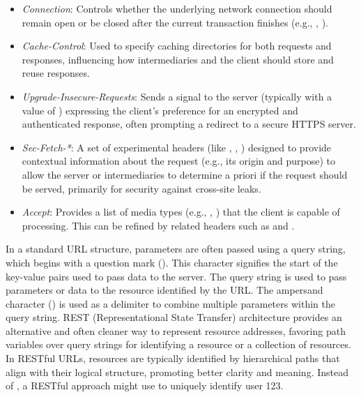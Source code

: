 \begin{itemize}
    \item \textit{Connection}: Controls whether the underlying network connection should remain open or be closed after the current transaction finishes (e.g., , ).
    \item \textit{Cache-Control}: Used to specify caching directories for both requests and responses, influencing how intermediaries and the client should store and reuse responses.
    \item \textit{Upgrade-Insecure-Requests}: Sends a signal to the server (typically with a value of ) expressing the client's preference for an encrypted and authenticated response, often prompting a redirect to a secure HTTPS server.
    \item \textit{Sec-Fetch-*}: A set of experimental headers (like , , ) designed to provide contextual information about the request (e.g., its origin and purpose) to allow the server or intermediaries to determine a priori if the request should be served, primarily for security against cross-site leaks.
    \item \textit{Accept}: Provides a list of media types (e.g., , ) that the client is capable of processing. This can be refined by related headers such as  and .
\end{itemize}

In a standard URL structure, parameters are often passed using a query string, which begins with a question mark (). This character signifies the start of the key-value pairs used to pass data to the server. The query string is used to pass parameters or data to the resource identified by the URL. The ampersand character (\NewTexttt{\&}) is used as a delimiter to combine multiple parameters within the query string. REST (Representational State Transfer) architecture provides an alternative and often cleaner way to represent resource addresses, favoring path variables over query strings for identifying a resource or a collection of resources. In RESTful URLs, resources are typically identified by hierarchical paths that align with their logical structure, promoting better clarity and meaning. Instead of , a RESTful approach might use  to uniquely identify user 123.

